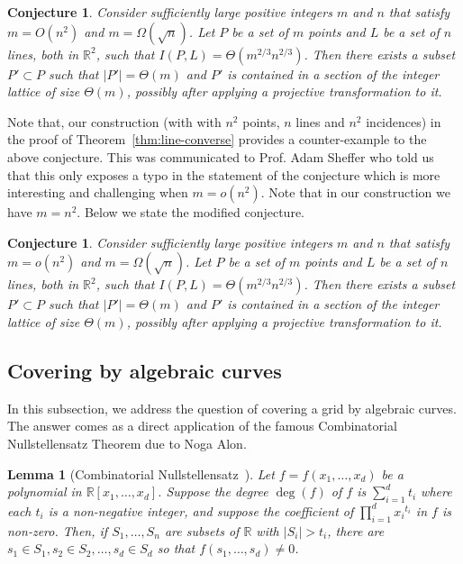 \documentclass[
final
]{dmtcs-episciences}
\numberwithin{equation}{subsection}
\newtheorem{lem}[defn]{Lemma}%
\newtheorem{conj}[defn]{Conjecture}%
\newcommand{\R}{\mathbb{R}}
\newcommand{\size}[1]{\left| #1 \right|}
\begin{document}
\begin{conj}
	Consider sufficiently large positive integers $m$ and $n$ that satisfy $m = O(n^2)$ and $m = \Omega(\sqrt{n})$. Let $P$ be a set of $m$ points and $L$ be a set of $n$ lines, both in $\R^2$, such that $I(P,L) = \Theta (m^{2/3} n^{2/3})$. Then there exists a subset $P' \subset P$ such that $\size{P'} =  \Theta(m)$ and $P'$ is contained in a section of the integer lattice of size $\Theta(m)$, possibly after applying a projective transformation to it.	
\end{conj}

Note that, our construction (with with $n^2$ points, $n$ lines and $n^2$ incidences) in the proof of Theorem~\ref{thm:line-converse} provides a counter-example to the above conjecture. This was communicated to Prof. Adam Sheffer who told us that this only exposes a typo in the statement of the conjecture which is more interesting and challenging when $m=o(n^2)$. Note that in our construction we have $m=n^2$. Below we state the modified conjecture.

\begin{conj}
	Consider sufficiently large positive integers $m$ and $n$ that satisfy $m = o(n^2)$ and $m = \Omega(\sqrt{n})$. Let $P$ be a set of $m$ points and $L$ be a set of $n$ lines, both in $\R^2$, such that $I(P,L) = \Theta (m^{2/3} n^{2/3})$. Then there exists a subset $P' \subset P$ such that $\size{P'} =  \Theta(m)$ and $P'$ is contained in a section of the integer lattice of size $\Theta(m)$, possibly after applying a projective transformation to it.	
\end{conj}




\subsection{Covering by algebraic curves}

In this subsection, we address the question of covering a grid by algebraic curves. The answer comes as a direct application of the famous Combinatorial Nullstellensatz Theorem due to Noga Alon.

\begin{lem}[Combinatorial Nullstellensatz~\cite{alon_1999}]
	Let $f = f(x_1,\ldots , x_d)$ be a polynomial in $\mathbb{R}[x_1,\ldots ,x_d]$.
	Suppose the degree $\deg(f)$ of $f$ is $\sum_{i=1}^d t_i$ where each $t_i$ is a non-negative integer, and suppose the coefficient of $\prod_{i=1}^d {x_i}^{t_i}$ in $f$ is non-zero. Then, if $S_1,\ldots ,S_n$ are subsets of $\mathbb{R}$ with $|S_i| > t_i$, there are $s_1\in S_1, s_2 \in S_2,\ldots , s_d \in S_d$ so that $f(s_1,\ldots ,s_d)\ne 0$.
	
	\label{lem:null}
\end{lem}
\end{document}
